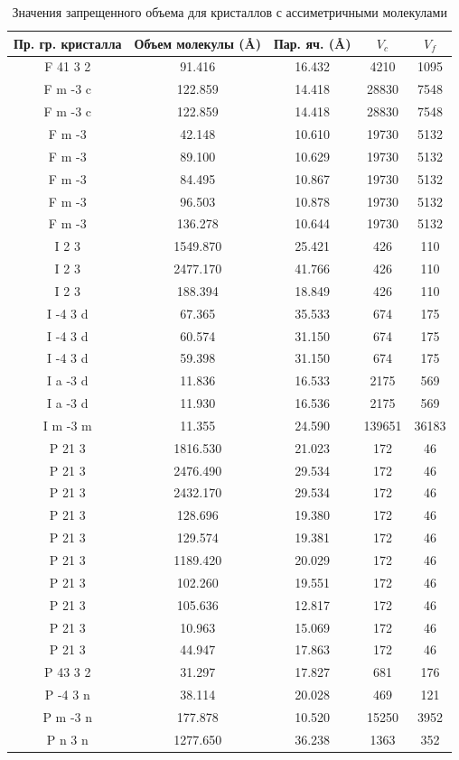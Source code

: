 \documentclass[12pt,a4paper, russian]{extarticle}
\begin{document}
\begin{table}[H]
\begin{tabular}{c|c|c|c|c}
Пр. гр. кристалла & Объем молекулы (\AA) & Пар. яч. (\AA) & $V_c$ & $V_f$\\
\hline
F 41 3 2 & 91.416 & 16.432 & 4210 & 1095\\
F m -3 c & 122.859 & 14.418 & 28830 & 7548\\
F m -3 c & 122.859 & 14.418 & 28830 & 7548\\
F m -3 & 42.148 & 10.610 & 19730 & 5132\\
F m -3 & 89.100 & 10.629 & 19730 & 5132\\
F m -3 & 84.495 & 10.867 & 19730 & 5132\\
F m -3 & 96.503 & 10.878 & 19730 & 5132\\
F m -3 & 136.278 & 10.644 & 19730 & 5132\\
I 2 3 & 1549.870 & 25.421 & 426 & 110\\
I 2 3 & 2477.170 & 41.766 & 426 & 110\\
I 2 3 & 188.394 & 18.849 & 426 & 110\\
I -4 3 d & 67.365 & 35.533 & 674 & 175\\
I -4 3 d & 60.574 & 31.150 & 674 & 175\\
I -4 3 d & 59.398 & 31.150 & 674 & 175\\
I a -3 d & 11.836 & 16.533 & 2175 & 569\\
I a -3 d & 11.930 & 16.536 & 2175 & 569\\
I m -3 m & 11.355 & 24.590 & 139651 & 36183\\
P 21 3 & 1816.530 & 21.023 & 172 & 46\\
P 21 3 & 2476.490 & 29.534 & 172 & 46\\
P 21 3 & 2432.170 & 29.534 & 172 & 46\\
P 21 3 & 128.696 & 19.380 & 172 & 46\\
P 21 3 & 129.574 & 19.381 & 172 & 46\\
P 21 3 & 1189.420 & 20.029 & 172 & 46\\
P 21 3 & 102.260 & 19.551 & 172 & 46\\
P 21 3 & 105.636 & 12.817 & 172 & 46\\
P 21 3 & 10.963 & 15.069 & 172 & 46\\
P 21 3 & 44.947 & 17.863 & 172 & 46\\
P 43 3 2 & 31.297 & 17.827 & 681 & 176\\
P -4 3 n & 38.114 & 20.028 & 469 & 121\\
P m -3 n & 177.878 & 10.520 & 15250 & 3952\\
P n 3 n & 1277.650 & 36.238 & 1363 & 352

\end{tabular}
\caption{Значения запрещенного объема для кристаллов с ассиметричными молекулами}
\end{table}

\nocite{*}
\printbibliography[title={\centering Литература}, heading=bibintoc]
\end{document}
